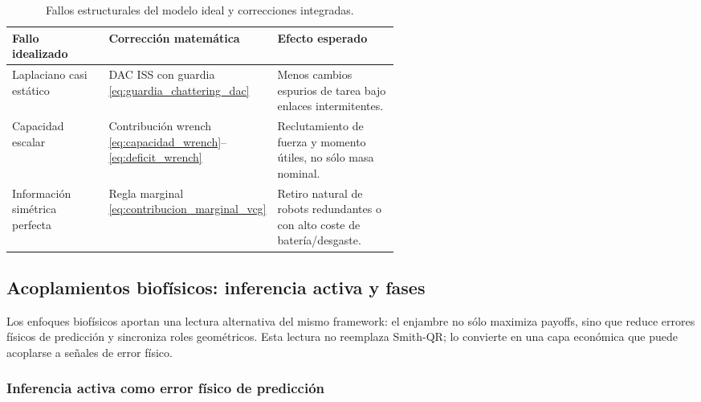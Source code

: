 \begin{table}[H]
\centering
\caption{Fallos estructurales del modelo ideal y correcciones integradas.}
\label{tab:robustez_estructural}
\small
\renewcommand{\arraystretch}{1.12}
\begin{tabularx}{\linewidth}{@{}>{\raggedright\arraybackslash}p{0.25\linewidth}>{\raggedright\arraybackslash}p{0.31\linewidth}Y@{}}
\toprule
\textbf{Fallo idealizado} & \textbf{Corrección matemática} & \textbf{Efecto esperado} \\
\midrule
Laplaciano casi estático & DAC ISS con guardia
\eqref{eq:guardia_chattering_dac} & Menos cambios espurios de tarea bajo enlaces
intermitentes. \\
Capacidad escalar & Contribución wrench
\eqref{eq:capacidad_wrench}--\eqref{eq:deficit_wrench} & Reclutamiento de fuerza y
momento útiles, no sólo masa nominal. \\
Información simétrica perfecta & Regla marginal
\eqref{eq:contribucion_marginal_vcg} & Retiro natural de robots redundantes o con alto
coste de batería/desgaste. \\
\bottomrule
\end{tabularx}
\end{table}

\subsection{Acoplamientos biofísicos: inferencia activa y fases}
\label{subsec:biofisica-activa-kuramoto}

Los enfoques biofísicos aportan una lectura alternativa del mismo framework: el enjambre
no sólo maximiza payoffs, sino que reduce errores físicos de predicción y sincroniza
roles geométricos. Esta lectura no reemplaza Smith-QR; lo convierte en una capa
económica que puede acoplarse a señales de error físico.

\subsubsection{Inferencia activa como error físico de predicción}

